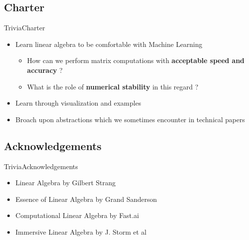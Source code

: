 \documentclass[10pt]{beamer}
\begin{document}
\subsection{Charter}
\begin{frame}{Trivia}{Charter}
  \begin{itemize}
    \item Learn linear algebra to be comfortable with Machine Learning
    \begin{itemize}
    \item How can we perform matrix computations with \textbf{acceptable speed and accuracy} ?
    \item What is the role of \textbf{numerical stability} in this regard ?
    \end{itemize}
    \item Learn through visualization and examples
    \item Broach upon abstractions which we sometimes encounter in technical papers

  \end{itemize}
\end{frame}

\subsection{Acknowledgements}
\begin{frame}{Trivia}{Acknowledgements}
  \begin{itemize}
    \item Linear Algebra by Gilbert Strang \href{https://ocw.mit.edu/courses/mathematics/18-06-linear-algebra-spring-2010/video-lectures/}{}
    \item \alert{Essence of Linear Algebra by Grand Sanderson} \href{https://www.youtube.com/watch?v=kjBOesZCoqc&list=PLZHQObOWTQDPD3MizzM2xVFitgF8hE_ab}{}
    \item Computational Linear Algebra by Fast.ai \href{http://www.fast.ai/2017/07/17/num-lin-alg/}{}
    \item Immersive Linear Algebra by J. Storm et al      \href{http://immersivemath.com/ila/index.html}{}


  \end{itemize}
\end{frame}
\end{document}
